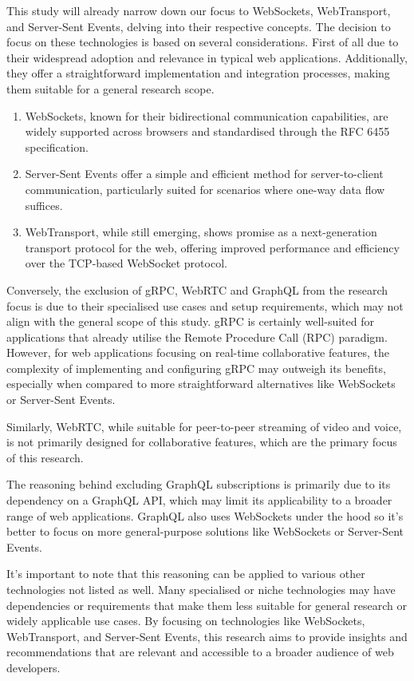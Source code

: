 This study will already narrow down our focus to WebSockets, WebTransport, and Server-Sent Events, delving into their respective concepts. The decision to focus on these technologies is based on several considerations. First of all due to their widespread adoption and relevance in typical web applications. Additionally, they offer a straightforward implementation and integration processes, making them suitable for a general research scope.

\begin{enumerate}
    \item WebSockets, known for their bidirectional communication capabilities, are widely supported across browsers and standardised through the RFC 6455 specification.
    \item Server-Sent Events offer a simple and efficient method for server-to-client communication, particularly suited for scenarios where one-way data flow suffices.
    \item WebTransport, while still emerging, shows promise as a next-generation transport protocol for the web, offering improved performance and efficiency over the TCP-based WebSocket protocol.
\end{enumerate}

Conversely, the exclusion of gRPC, WebRTC and GraphQL from the research focus is due to their specialised use cases and setup requirements, which may not align with the general scope of this study. gRPC is certainly well-suited for applications that already utilise the Remote Procedure Call (RPC) paradigm. However, for web applications focusing on real-time collaborative features, the complexity of implementing and configuring gRPC may outweigh its benefits, especially when compared to more straightforward alternatives like WebSockets or Server-Sent Events.

Similarly, WebRTC, while suitable for peer-to-peer streaming of video and voice, is not primarily designed for collaborative features, which are the primary focus of this research.

The reasoning behind excluding GraphQL subscriptions is primarily due to its dependency on a GraphQL API, which may limit its applicability to a broader range of web applications. GraphQL also uses WebSockets under the hood so it's better to focus on more general-purpose solutions like WebSockets or Server-Sent Events.

It's important to note that this reasoning can be applied to various other technologies not listed as well. Many specialised or niche technologies may have dependencies or requirements that make them less suitable for general research or widely applicable use cases. By focusing on technologies like WebSockets, WebTransport, and Server-Sent Events, this research aims to provide insights and recommendations that are relevant and accessible to a broader audience of web developers.

